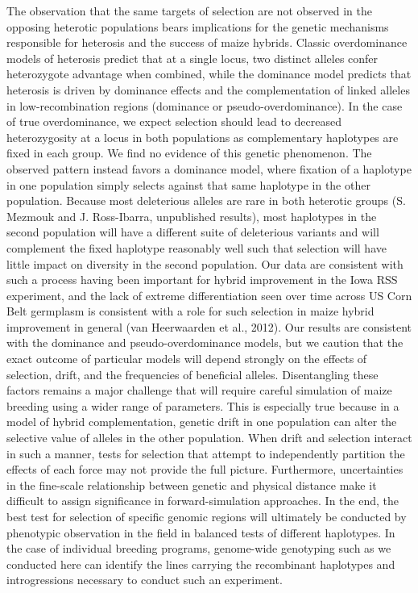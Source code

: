 The observation that the same targets of selection are not observed in the opposing heterotic populations bears implications for the genetic mechanisms responsible for heterosis and the success of maize hybrids. Classic overdominance models of heterosis predict that at a single locus, two distinct alleles confer heterozygote advantage when combined, while the dominance model predicts that heterosis is driven by dominance effects and the complementation of linked alleles in low-recombination regions (dominance or pseudo-overdominance). In the case of true overdominance, we expect selection should lead to decreased heterozygosity at a locus in both populations as complementary haplotypes are fixed in each group. We find no evidence of this genetic phenomenon. The observed pattern instead favors a dominance model, where fixation of a haplotype in one population simply selects against that same haplotype in the other population. Because most deleterious alleles are rare in both heterotic groups (S. Mezmouk and J. Ross-Ibarra, unpublished results), most haplotypes in the second population will have a different suite of deleterious variants and will complement the fixed haplotype reasonably well such that selection will have little impact on diversity in the second population. Our data are consistent with such a process having been important for hybrid improvement in the Iowa RSS experiment, and the lack of extreme differentiation seen over time across US Corn Belt germplasm is consistent with a role for such selection in maize hybrid improvement in general (van Heerwaarden et al., 2012).
	 Our results are consistent with the dominance and pseudo-overdominance models, but we caution that the exact outcome of particular models will depend strongly on the effects of selection, drift, and the frequencies of beneficial alleles. Disentangling these factors remains a major challenge that will require careful simulation of maize breeding using a wider range of parameters. This is especially true because in a model of hybrid complementation, genetic drift in one population can alter the selective value of alleles in the other population. When drift and selection interact in such a manner, tests for selection that attempt to independently partition the effects of each force may not provide the full picture. Furthermore, uncertainties in the fine-scale relationship between genetic and physical distance make it difficult to assign significance in forward-simulation approaches. In the end, the best test for selection of specific genomic regions will ultimately be conducted by phenotypic observation in the field in balanced tests of different haplotypes. In the case of individual breeding programs, genome-wide genotyping such as we conducted here can identify the lines carrying the recombinant haplotypes and introgressions necessary to conduct such an experiment. 
